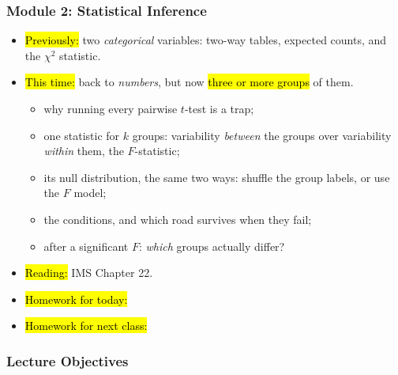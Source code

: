 

\begin{frame}
\frametitle{Module 2: Statistical Inference}
    \begin{itemize}
        \item \hl{Previously:} two \emph{categorical} variables: two-way tables, expected counts, and the $\chi^2$ statistic.
        \item \hl{This time:} back to \emph{numbers}, but now \hl{three or more groups} of them.
          \begin{itemize}
              \item why running every pairwise $t$-test is a trap;
              \item one statistic for $k$ groups: variability \emph{between} the groups over variability \emph{within} them, the $F$-statistic;
              \item its null distribution, the same two ways: shuffle the group labels, or use the $F$ model;
              \item the conditions, and which road survives when they fail;
              \item after a significant $F$: \emph{which} groups actually differ?
          \end{itemize}
        \item \hl{Reading:} IMS Chapter 22.
        \item \hl{Homework for today:}
        \item \hl{Homework for next class:}
    \end{itemize}
\end{frame}


\begin{frame}
    \frametitle{Lecture Objectives}
\end{frame}
